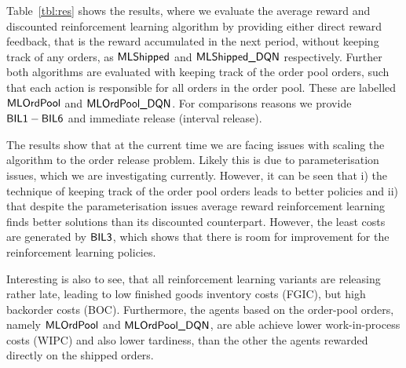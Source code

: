 \documentclass[envcountsame]{llncs}
\begin{document}
Table~\ref{tbl:res} shows the results, where we evaluate the average reward and discounted
reinforcement learning algorithm by providing either direct reward feedback, that is the reward
accumulated in the next period, without keeping track of any orders, as \(\textsf{MLShipped}\) and
\(\textsf{MLShipped\_DQN}\) respectively. Further both algorithms are evaluated with keeping track of the
order pool orders, such that each action is responsible for all orders in the order pool. These are
labelled \(\textsf{MLOrdPool}\) and \(\textsf{MLOrdPool\_DQN}\). For comparisons reasons we provide
\(\textsf{BIL1}-\textsf{BIL6}\) and immediate release (interval release).

The results show that at the current time we are facing issues with scaling the algorithm to the
order release problem. Likely this is due to parameterisation issues, which we are investigating
currently. However, it can be seen that i) the technique of keeping track of the order pool orders
leads to better policies and ii) that despite the parameterisation issues average reward
reinforcement learning finds better solutions than its discounted counterpart. However, the least
costs are generated by \(\textsf{BIL3}\), which shows that there is room for improvement for the
reinforcement learning policies.

Interesting is also to see, that all reinforcement learning variants are releasing rather late,
leading to low finished goods inventory costs (FGIC), but high backorder costs (BOC). Furthermore,
the agents based on the order-pool orders, namely \(\textsf{MLOrdPool}\) and \(\textsf{MLOrdPool\_DQN}\), are able
achieve lower work-in-process costs (WIPC) and also lower tardiness, than the other the agents
rewarded directly on the shipped orders.
\end{document}
